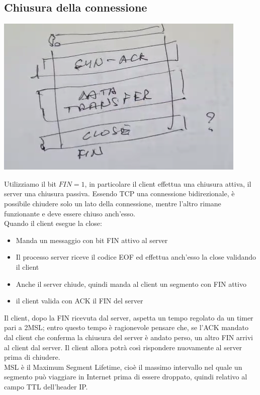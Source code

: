\documentclass[11pt, oneside]{article}   	%
\begin{document}
\subsection*{Chiusura della connessione}
\begin{center}
\includegraphics[scale=0.5]{closeee}
\end{center}
Utilizziamo il bit $FIN = 1$, in particolare il client effettua una chiusura attiva, il server una chiusura passiva. Essendo TCP una connessione bidirezionale, è possibile chiudere solo un lato della connessione, mentre l’altro rimane funzionante e deve essere chiuso anch’esso.\\
Quando il client esegue la close:\begin{itemize}
\item Manda un messaggio con bit FIN attivo al server
\item Il processo server riceve il codice EOF ed effettua anch’esso la close validando il client
\item Anche il server chiude, quindi manda al client un segmento con FIN attivo
\item il client valida con ACK il FIN del server
\end{itemize}
Il client, dopo la FIN ricevuta dal server, aspetta un tempo regolato da un timer pari a 2MSL; entro questo tempo è ragionevole pensare che, se l’ACK mandato dal client che conferma la chiusura del server è andato perso, un altro FIN arrivi al client dal server. Il client allora potrà così rispondere nuovamente al server prima di chiudere.\\
MSL è il Maximum Segment Lifetime, cioè il massimo intervallo nel quale un segmento può viaggiare in Internet prima di essere droppato, quindi relativo al campo TTL dell’header IP.
\end{document}
